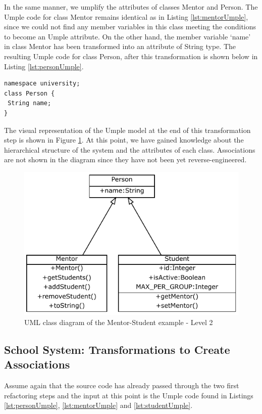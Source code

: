 In the same manner, we umplify the attributes of classes Mentor and Person.
The Umple code for class Mentor remains identical as in Listing \ref{lst:mentorUmple}, since we could not find any member variables in this class meeting the conditions to become an Umple attribute. On the other hand, the member variable `name' in class Mentor has been transformed into an attribute of String type. The resulting Umple code for class Person, after this transformation is shown below in Listing \ref{lst:personUmple}.

\begin{lstlisting}[style=UmpleOut,caption=Person.ump,label=lst:personUmple]
namespace university;
class Person {
 String name;
}
\end{lstlisting}

The visual representation of the Umple model at the end of this transformation step is shown in Figure \ref{fig:Example1a2}. At this point, we have gained knowledge about the hierarchical structure of the system and the attributes of each class. Associations are not shown in the diagram since they have not been yet reverse-engineered.

\begin{figure}[h]
\centering
\includegraphics{Figures/Example1a2.pdf} 
\caption{UML class diagram of the Mentor-Student example - Level 2}
\label{fig:Example1a2}
\end{figure}

\subsection{School System: Transformations to Create Associations}

Assume again that the source code has already passed through the two first refactoring steps and the input at this point is the Umple code found in Listings \ref{lst:personUmple}, \ref{lst:mentorUmple} and \ref{lst:studentUmple}.


